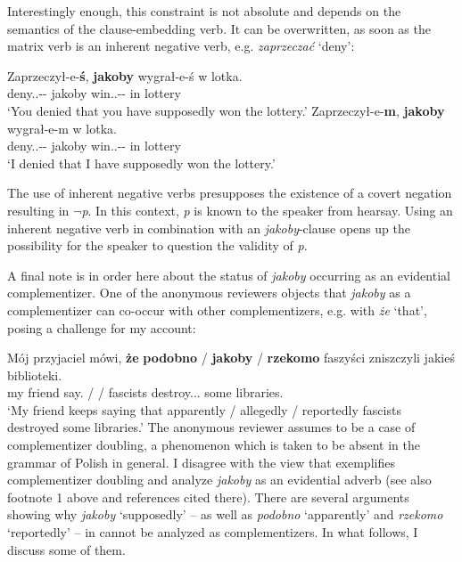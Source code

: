 \documentclass[output=paper
,modfonts
,nonflat]{langsci/langscibook}
\begin{document}
Interestingly enough, this constraint is not absolute and depends on the semantics of the clause-embedding verb. It can be overwritten, as soon as the matrix verb is an inherent negative verb, e.g. \emph{zaprzeczać} `deny':

 \ea \ea \gll Zaprzeczył-e-\textbf{ś}, \textbf{jakoby} wygrał-e-ś w lotka.\\
  			deny.{\lptcp}.{\sg}-{\masc}-{\secondperson}{\sg} jakoby win.{\lptcp}.{\sg}-{\masc}-{\secondperson}{\sg} in lottery \\
	\glt	 `You denied that you have supposedly won the lottery.'
		\ex\gll	Zaprzeczył-e-\textbf{m}, \textbf{jakoby} wygrał-e-m w lotka.\\
  			deny.{\lptcp}.{\sg}-{\masc}-{\firstperson}{\sg} jakoby win.{\lptcp}.{\sg}-{\masc}-{\firstperson}{\sg} in lottery \\
	\glt		 `I denied that I have supposedly won the lottery.'
\z\z

The use of inherent negative verbs presupposes the existence of a covert negation resulting in $\lnot$\emph{p}. In this context, \emph{p} is known to the speaker from hearsay. Using an inherent negative verb in combination with an \emph{jakoby}-clause opens up the possibility for the speaker to question the validity of \emph{p}.

A final note is in order here about the status of \emph{jakoby} occurring as an evidential complementizer. One of the anonymous reviewers objects that \emph{jakoby} as a complementizer can co-occur with other complementizers, e.g. with \emph{że} `that', posing a challenge for my account:

\ea \gll Mój przyjaciel mówi, \textbf{że} \textbf{podobno} / \textbf{jakoby} / \textbf{rzekomo} faszyści zniszczyli jakieś biblioteki.  \label{challenge} \\
		my friend say.{\thirdperson}{\sg} {\comp} {\comp} / {\comp} / {\comp}  fascists destroy.{\lptcp}.{\vir}.{\pl} some libraries. \\
\glt	 `My friend keeps saying that apparently / allegedly / reportedly fascists destroyed some libraries.'
\z
The anonymous reviewer assumes  to be a case of complementizer doubling, a phenomenon which is taken to be absent in the grammar of Polish in general. I disagree with the view that  exemplifies complementizer doubling and analyze \emph{jakoby}  as an evidential adverb (see also footnote 1 above and references cited there). There are several arguments showing why \emph{jakoby}  `supposedly' – as well as \emph{podobno} `apparently' and \emph{rzekomo} `reportedly' – in  cannot be analyzed as  complementizers. In what follows, I discuss some of them. 
\end{document}
